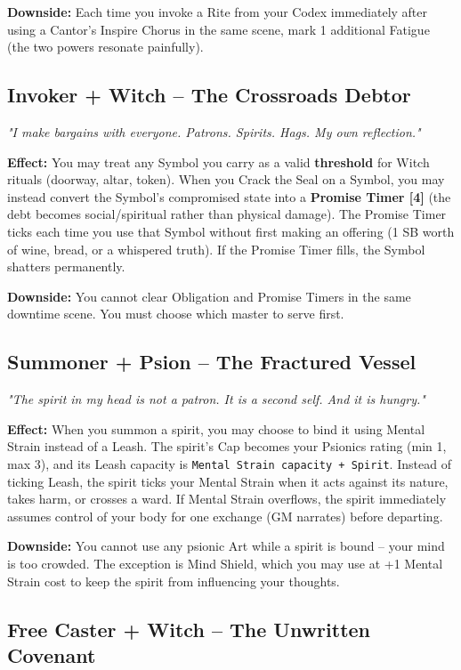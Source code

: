 \documentclass[10pt,a5paper]{book}
\begin{document}
\textbf{Downside:} Each time you invoke a Rite from your Codex immediately after using a Cantor's Inspire Chorus in the same scene, mark 1 additional Fatigue (the two powers resonate painfully).

\subsection*{Invoker + Witch -- The Crossroads Debtor}

\textit{"I make bargains with everyone. Patrons. Spirits. Hags. My own reflection."}

\textbf{Effect:} You may treat any Symbol you carry as a valid \textbf{threshold} for Witch rituals (doorway, altar, token). When you Crack the Seal on a Symbol, you may instead convert the Symbol's compromised state into a \textbf{Promise Timer [4]} (the debt becomes social/spiritual rather than physical damage). The Promise Timer ticks each time you use that Symbol without first making an offering (1 SB worth of wine, bread, or a whispered truth). If the Promise Timer fills, the Symbol shatters permanently.

\textbf{Downside:} You cannot clear Obligation and Promise Timers in the same downtime scene. You must choose which master to serve first.

\subsection*{Summoner + Psion -- The Fractured Vessel}

\textit{"The spirit in my head is not a patron. It is a second self. And it is hungry."}

\textbf{Effect:} When you summon a spirit, you may choose to bind it using Mental Strain instead of a Leash. The spirit's Cap becomes your Psionics rating (min 1, max 3), and its Leash capacity is \texttt{Mental Strain capacity + Spirit}. Instead of ticking Leash, the spirit ticks your Mental Strain when it acts against its nature, takes harm, or crosses a ward. If Mental Strain overflows, the spirit immediately assumes control of your body for one exchange (GM narrates) before departing.

\textbf{Downside:} You cannot use any psionic Art while a spirit is bound -- your mind is too crowded. The exception is Mind Shield, which you may use at +1 Mental Strain cost to keep the spirit from influencing your thoughts.

\subsection*{Free Caster + Witch -- The Unwritten Covenant}
\end{document}
